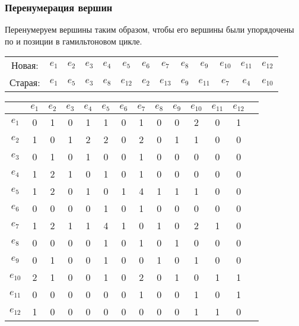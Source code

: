 \documentclass[12pt, a4paper] {ncc}
\begin{document}
\subsubsection{Перенумерация вершин}
Перенумеруем вершины таким образом, чтобы его вершины были упорядочены по и
позиции в гамильтоновом цикле.

\begin{tabular}{cc c c c c c c c c c c c}
Новая:  & $e_{1}$ & $e_{2}$ & $e_{3}$  & $e_{4}$ & $e_{5}$ & $e_6$ & $e_{7}$ & $e_{8}$ & $e_{9}$ & $e_{10}$ & $e_{11}$ & $e_{12}$ \\
Старая: & $e_{1}$ & $e_{5}$ & $e_{3}$  & $e_{8}$ & $e_{12}$& $e_{2}$ & $e_{13}$& $e_{9}$ & $e_{11}$& $e_{7}$  & $e_4$ & $e_{10}$ \\
\end{tabular}

%
%
\begin{longtable}{|c|c|c|c|c|c|c|c|c|c|c|c|c|c|}
\hline
      & $e_{1}$ & $e_{2}$ & $e_{3}$ & $e_{4}$ & $e_{5}$ & $e_{6}$ & $e_{7}$ & $e_{8}$ & $e_{9}$ & $e_{10}$ & $e_{11}$ & $e_{12}$ \\
\hline  %
$e_{1}$  & 0 &1  & 0  &1 & 1&0  &1   & 0   &0   & 2   & 0   & 1 \\ 
$e_{2}$  & 1 &0  & 1  &2 & 2&0  &2   & 0   &1   & 1   & 0   & 0 \\ 
$e_{3}$  & 0 &1  & 0  &1 & 0&0  &1   & 0   &0   & 0   & 0   & 0 \\ 
$e_{4}$  & 1 &2  & 1  &0 & 1&0  &1   & 0   &0   & 0   & 0   & 0 \\ 
$e_{5}$ & 1 &2  & 0  &1 & 0&1  &4   & 1   &1   & 1   & 0   & 0 \\ 
$e_{6}$  & 0 &0  & 0  &0 & 1&0  &1   & 0   &0   & 0   & 0   & 0 \\ 
$e_{7}$ & 1 &2  & 1  &1 & 4&1  &0   & 1   &0   & 2   & 1   & 0 \\ 
$e_{8}$  & 0 &0  & 0  &0 & 1&0  &1   & 0   &1   & 0   & 0   & 0 \\ 
$e_{9}$ & 0 &1  & 0  &0 & 1&0  &0   & 1   &0   & 1   & 0   & 0 \\ 
$e_{10}$  & 2 &1  & 0  &0 & 1&0  &2   & 0   &1   & 0   & 1   & 1 \\ 
$e_{11}$  & 0 &0  & 0  &0 & 0&0  &1   & 0   &0   & 1   & 0   & 1 \\ 
$e_{12}$  & 1 &0  & 0  &0 & 0&0  &0   & 0   &0   & 1   & 1   & 0 \\ 
\hline
\end{longtable}
%
\end{document}
